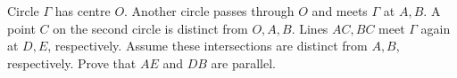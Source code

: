 Circle $\Gamma$ has centre $O$. Another circle passes through $O$ and meets $\Gamma$ at $A,B$. A point $C$ on the second circle is distinct from $O,A,B$. Lines $AC,BC$ meet $\Gamma$ again at $D,E$, respectively. Assume these intersections are distinct from $A,B$, respectively. Prove that $AE$ and $DB$ are parallel.
